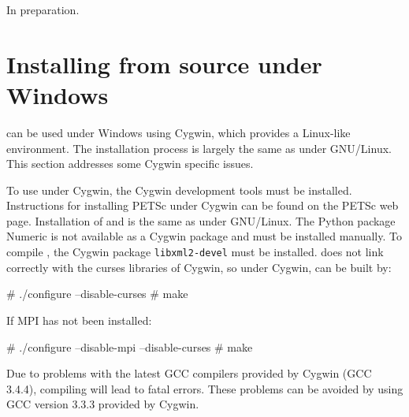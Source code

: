 In preparation.


\section{Installing from source under Windows}
\label{app:cygwin}

\dolfin{} can be used under Windows using Cygwin, which provides a Linux-like
environment. The installation process is largely the same as under GNU/Linux. 
This section addresses some Cygwin specific issues.

To use \dolfin{} under Cygwin, the Cygwin development tools must be installed. 
Instructions for installing PETSc under Cygwin can be found on the  PETSc web 
page. Installation of \ffc{} and \fiat{} is the same as under GNU/Linux. The 
Python package Numeric is not available as a Cygwin package and must be 
installed manually. To compile \dolfin{}, the Cygwin package  
\texttt{libxml2-devel} must be installed. \dolfin{} does not link correctly with 
the curses libraries of Cygwin, so under Cygwin, \dolfin{} can be built by:
\begin{code}
  # ./configure --disable-curses
  # make
\end{code}
If MPI has not been installed:
\begin{code}
  # ./configure --disable-mpi --disable-curses
  # make
\end{code}

Due to problems with the latest GCC compilers provided by Cygwin (GCC 3.4.4), compiling 
\dolfin{} will lead to fatal errors. These problems can be avoided by using GCC version 
3.3.3 provided by Cygwin.
